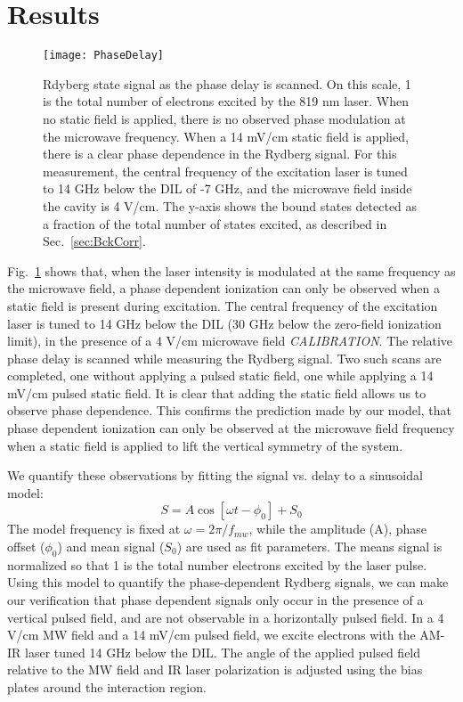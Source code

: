 \documentclass[aps,pra,preprint,groupedaddress]{revtex4-1}
\begin{document}
\section{\label{results} Results}

\begin{figure}
	\texttt{[image: PhaseDelay]}
	\caption{Rdyberg state signal as the phase delay is scanned. On this scale, 1 is the total number of electrons excited by the 819 nm laser. When no static field is applied, there is no observed phase modulation at the microwave frequency. When a 14 mV/cm static field is applied, there is a clear phase dependence in the Rydberg signal. For this measurement, the central frequency of the excitation laser is tuned to 14 GHz below the DIL of -7 GHz, and the microwave field inside the cavity is 4 V/cm. The y-axis shows the bound states detected as a fraction of the total number of states excited, as described in Sec.~\ref{sec:BckCorr}.}
	\label{fig:PhaseDelay}
\end{figure}

Fig.~\ref{fig:PhaseDelay} shows that, when the laser intensity is modulated at the same frequency as the microwave field, a phase dependent ionization can only be observed when a static field is present during excitation. The central frequency of the excitation laser is tuned to 14 GHz below the DIL (30 GHz below the zero-field ionization limit), in the presence of a 4 V/cm microwave field \emph{CALIBRATION}. The relative phase delay is scanned while measuring the Rydberg signal. Two such scans are completed, one without applying a pulsed static field, one while applying a 14 mV/cm pulsed static field. It is clear that adding the static field allows us to observe phase dependence. This confirms the prediction made by our model, that phase dependent ionization can only be observed at the microwave field frequency when a static field is applied to lift the vertical symmetry of the system.

We quantify these observations by fitting the signal vs. delay to a sinusoidal model:
\begin{equation} \label{eq:modfit}
S = A \cos{[\omega t - \phi_0]} + S_0
\end{equation}
The model frequency is fixed at $\omega = 2\pi / f_{mw}$, while the amplitude (A), phase offset ($\phi_0$) and mean signal ($S_0$) are used as fit parameters. The means signal is normalized so that 1 is the total number electrons excited by the laser pulse. Using this model to quantify the phase-dependent Rydberg signals, we can make our verification that phase dependent signals only occur in the presence of a vertical pulsed field, and are not observable in a horizontally pulsed field. In a 4 V/cm MW field and a 14 mV/cm pulsed field, we excite electrons with the AM-IR laser tuned 14 GHz below the DIL. The angle of the applied pulsed field relative to the MW field and IR laser polarization is adjusted using the bias plates around the interaction region.
\end{document}
